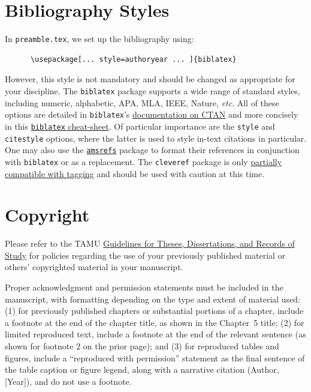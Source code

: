 \section{Bibliography Styles}
In \texttt{preamble.tex}, we set up the bibliography using:
\begin{verbatim}
      \usepackage[... style=authoryear ... ]{biblatex}
\end{verbatim}
However, this style is not mandatory and should be changed as appropriate for your discipline.
The \texttt{biblatex} package supports a wide range of standard styles, including numeric, alphabetic, APA, MLA, IEEE, Nature, \textit{etc}.
All of these options are detailed in \texttt{biblatex}'s
\href{https://ctan.org/pkg/biblatex?lang=en}{documentation on CTAN} and more concisely in this
\href{https://tug.ctan.org/info/biblatex-cheatsheet/biblatex-cheatsheet.pdf}{\texttt{biblatex} cheat-sheet}.
Of particular importance are the \texttt{style} and \texttt{citestyle} options, where the latter is used to style in-text citations in particular.
One may also use the \href{https://ctan.org/pkg/amsrefs}{\texttt{amsrefs}} package to format their references in conjunction with \texttt{biblatex} or as a replacement.
The \texttt{cleveref} package is only \href{https://latex3.github.io/tagging-project/tagging-status/}{partially compatible with tagging}  and should be used with caution at this time.

\section{Copyright}
Please refer to the TAMU \href{https://grad.tamu.edu/degree-completion/thesis-and-dissertation/writing-tools/index.html}{Guidelines for Theses, Dissertations, and Records of Study} for policies regarding the use of your previously published material or others’ copyrighted material in your manuscript.

Proper acknowledgment and permission statements must be included in the manuscript, with formatting depending on the type and extent of material used: (1) for previously published chapters or substantial portions of a chapter, include a footnote at the end of the chapter title, as shown in the Chapter~5 title; (2) for limited reproduced text, include a footnote at the end of the relevant sentence (as shown for footnote 2 on the prior page); and (3) for reproduced tables and figures, include a “reproduced with permission” statement as the final sentence of the table caption or figure legend, along with a narrative citation (Author, [Year]), and do not use a footnote.
